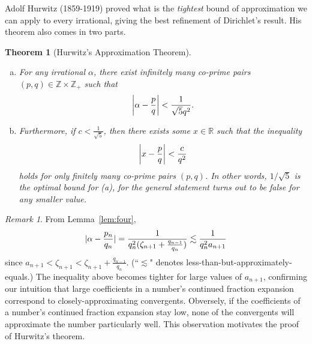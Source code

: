 \documentclass[12pt, letterpaper, oneside]{book}
\newcommand{\ga}{\ensuremath{\alpha}}
\newcommand{\gz}{\ensuremath{\zeta}}
\newcommand{\R}{\mathbb{R}}
\newcommand{\Z}{\mathbb{Z}}
\DeclarePairedDelimiter{\abs}{\lvert}{\rvert}
\theoremstyle{plain}
\newtheorem{theorem}{Theorem}
\theoremstyle{definition}
\theoremstyle{remark}
\newtheorem*{remark}{Remark}
\begin{document}
Adolf Hurwitz (1859-1919) proved what is the \textit{tightest} bound
of approximation we can apply to every irrational, giving the best refinement of Dirichlet's result. His theorem also comes in two parts. 

\begin{theorem}[Hurwitz's Approximation Theorem]\label{thm:hurwitz}
~
\begin{enumerate}[(a)]
  \item For any irrational $\ga$, there exist infinitely many
    co-prime pairs $(p,q) \in \Z \times \Z_+$ such that
    \[
      \abs*{\ga - \frac{p}{q}} < \frac{1}{\sqrt{5}q^2}.
    \]
  \item Furthermore, if $c < \frac{1}{\sqrt{5}}$, then there exists some $x \in \R$ such that the inequality
    \[
      \abs*{x - \frac{p}{q}} < \frac{c}{q^2}
    \]
    holds for only finitely many co-prime pairs $(p,q)$. In other words, $1/\sqrt{5}$ is the optimal bound for (a), for the general statement turns out to be false for any smaller value. 
  \end{enumerate}
\end{theorem}

\begin{remark}
  From Lemma~\ref{lem:four},
  \[
    \abs{\ga - \frac{p_n}{q_n}} =
    \frac{1}{q_n^2(\gz_{n+1}+\frac{q_{n-1}}{q_n})} \lesssim
    \frac{1}{q_n^2 a_{n+1}}
  \]
  since $a_{n+1} < \gz_{n+1} < \gz_{n+1} + \frac{q_{n-1}}{q_n}$. (``$\lesssim$" denotes less-than-but-approximately-equals.) The inequality above becomes tighter for large values of $a_{n+1}$,
  confirming our intuition that large coefficients in a number's
  continued fraction expansion correspond to closely-approximating
  convergents. Obversely, if the coefficients of a number's continued
  fraction expansion stay low, none of the convergents will
  approximate the number particularly well. This observation motivates
  the proof of Hurwitz's theorem.
\end{remark}
\end{document}
